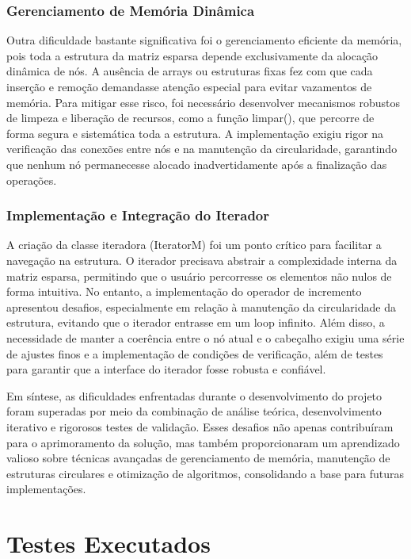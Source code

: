 \documentclass[12pt]{article}
\begin{document}
    \subsubsection{Gerenciamento de Memória Dinâmica}
        Outra dificuldade bastante significativa foi o gerenciamento eficiente da memória, pois toda a estrutura da matriz esparsa depende exclusivamente da alocação dinâmica de nós. A ausência de arrays ou estruturas fixas fez com que cada inserção e remoção demandasse atenção especial para evitar vazamentos de memória. Para mitigar esse risco, foi necessário desenvolver mecanismos robustos de limpeza e liberação de recursos, como a função limpar(), que percorre de forma segura e sistemática toda a estrutura. A implementação exigiu rigor na verificação das conexões entre nós e na manutenção da circularidade, garantindo que nenhum nó permanecesse alocado inadvertidamente após a finalização das operações.
    \subsubsection{Implementação e Integração do Iterador}
    A criação da classe iteradora (IteratorM) foi um ponto crítico para facilitar a navegação na estrutura. O iterador precisava abstrair a complexidade interna da matriz esparsa, permitindo que o usuário percorresse os elementos não nulos de forma intuitiva. No entanto, a implementação do operador de incremento apresentou desafios, especialmente em relação à manutenção da circularidade da estrutura, evitando que o iterador entrasse em um loop infinito. Além disso, a necessidade de manter a coerência entre o nó atual e o cabeçalho exigiu uma série de ajustes finos e a implementação de condições de verificação, além de testes para garantir que a interface do iterador fosse robusta e confiável.

Em síntese, as dificuldades enfrentadas durante o desenvolvimento do projeto foram superadas por meio da combinação de análise teórica, desenvolvimento iterativo e rigorosos testes de validação. Esses desafios não apenas contribuíram para o aprimoramento da solução, mas também proporcionaram um aprendizado valioso sobre técnicas avançadas de gerenciamento de memória, manutenção de estruturas circulares e otimização de algoritmos, consolidando a base para futuras implementações.
    
\section{Testes Executados}
\end{document}
